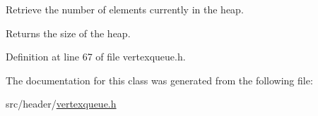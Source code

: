 Retrieve the number of elements currently in the heap. 

\begin{DoxyReturn}{Returns}
the size of the heap. 
\end{DoxyReturn}


Definition at line 67 of file vertexqueue.\+h.



The documentation for this class was generated from the following file\+:\begin{DoxyCompactItemize}
\item 
src/header/\hyperlink{vertexqueue_8h}{vertexqueue.\+h}\end{DoxyCompactItemize}
